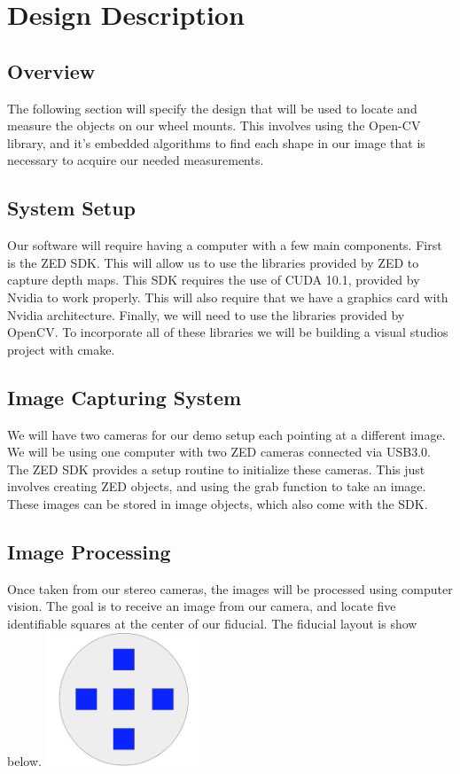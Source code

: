 \documentclass[onecolumn, draftclsnofoot,10pt, compsoc]{IEEEtran}
\begin{document}
\section{Design Description} 
\subsection{Overview}
The following section will specify the design that will be used to locate and measure the objects on our wheel mounts. This involves using the Open-CV library, and it's embedded algorithms to find each shape in our image that is necessary to acquire our needed measurements.

\subsection{System Setup}
Our software will require having a computer with a few main components. First is the ZED SDK. This will allow us to use the libraries provided by ZED to capture depth maps. This SDK requires the use of CUDA 10.1, provided by Nvidia to work properly. This will also require that we have a graphics card with Nvidia architecture. Finally, we will need to use the libraries provided by OpenCV. To incorporate all of these libraries we will be building a visual studios project with cmake. 

\subsection{Image Capturing System}
We will have two cameras for our demo setup each pointing at a different image. We will be using one computer with two ZED cameras connected via USB3.0. The ZED SDK provides a setup routine to initialize these cameras.  This just involves creating ZED objects, and using the grab function to take an image.  These images can be stored in image objects, which also come with the SDK.

\subsection{Image Processing}
Once taken from our stereo cameras, the images will be processed using computer vision.  The goal is to receive an image from our camera, and locate five identifiable squares at the center of our fiducial.  The fiducial layout is show below.
\newline
\newline
\includegraphics[height=4cm]{Images/img1.png}
\newline
\newline
\end{document}
